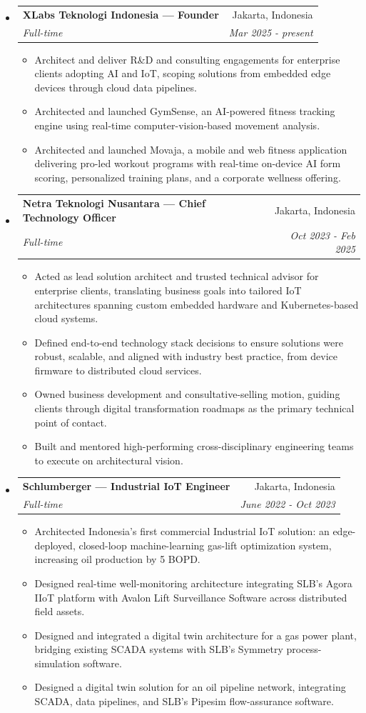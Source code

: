 \documentclass[letterpaper,9pt]{article}
\makeatletter
\newlength{\outerbordwidth}
\newcommand{\resitem}[1]{\item #1 \vspace{-2pt}}
\newcommand{\resheading}[1]{\vspace{8pt}
  \parbox{\textwidth}{\setlength{\FrameSep}{\outerbordwidth}
    \begin{shaded}

\setlength{\fboxsep}{0pt}\framebox[\textwidth][l]{\setlength{\fboxsep}{3pt}\fcolorbox{shadecolorB}{shadecolorB}{\textbf{\sffamily{\mbox{~}\makebox[7.2in][l]{#1} \vphantom{p\^{E}}}}}}
    \end{shaded}
  }\vspace{-13pt}
}
\newcommand{\ressubheading}[4]{
\begin{tabular*}{7.0in}{l@{\cftdotfill{\cftsecdotsep}\extracolsep{\fill}}r}
		\textbf{#1} & #2 \\
        \textit{#3} & \textit{#4} \\
\end{tabular*}\vspace{-6.3pt}}
\makeatother
\begin{document}

\resheading{Work Experience}


\begin{itemize}
  \item
    \ressubheading{XLabs Teknologi Indonesia --- Founder}{Jakarta, Indonesia}{Full-time}{Mar 2025 - present}
    \begin{itemize}
      \resitem{Architect and deliver R\&D and consulting engagements for enterprise clients adopting AI and IoT, scoping solutions from embedded edge devices through cloud data pipelines.}
      \resitem{Architected and launched GymSense, an AI-powered fitness tracking engine using real-time computer-vision-based movement analysis.}
      \resitem{Architected and launched Movaja, a mobile and web fitness application delivering pro-led workout programs with real-time on-device AI form scoring, personalized training plans, and a corporate wellness offering.}
    \end{itemize}

  \item
    \ressubheading{Netra Teknologi Nusantara --- Chief Technology Officer}{Jakarta, Indonesia}{Full-time}{Oct 2023 - Feb 2025}
    \begin{itemize}
      \resitem{Acted as lead solution architect and trusted technical advisor for enterprise clients, translating business goals into tailored IoT architectures spanning custom embedded hardware and Kubernetes-based cloud systems.}
      \resitem{Defined end-to-end technology stack decisions to ensure solutions were robust, scalable, and aligned with industry best practice, from device firmware to distributed cloud services.}
      \resitem{Owned business development and consultative-selling motion, guiding clients through digital transformation roadmaps as the primary technical point of contact.}
      \resitem{Built and mentored high-performing cross-disciplinary engineering teams to execute on architectural vision.}
    \end{itemize}

  \item
    \ressubheading{Schlumberger --- Industrial IoT Engineer}{Jakarta, Indonesia}{Full-time}{June 2022 - Oct 2023}
    \begin{itemize}
      \resitem{Architected Indonesia's first commercial Industrial IoT solution: an edge-deployed, closed-loop machine-learning gas-lift optimization system, increasing oil production by 5 BOPD.}
      \resitem{Designed real-time well-monitoring architecture integrating SLB's Agora IIoT platform with Avalon Lift Surveillance Software across distributed field assets.}
      \resitem{Designed and integrated a digital twin architecture for a gas power plant, bridging existing SCADA systems with SLB's Symmetry process-simulation software.}
      \resitem{Designed a digital twin solution for an oil pipeline network, integrating SCADA, data pipelines, and SLB's Pipesim flow-assurance software.}
    \end{itemize}


\end{itemize}
\end{document}
